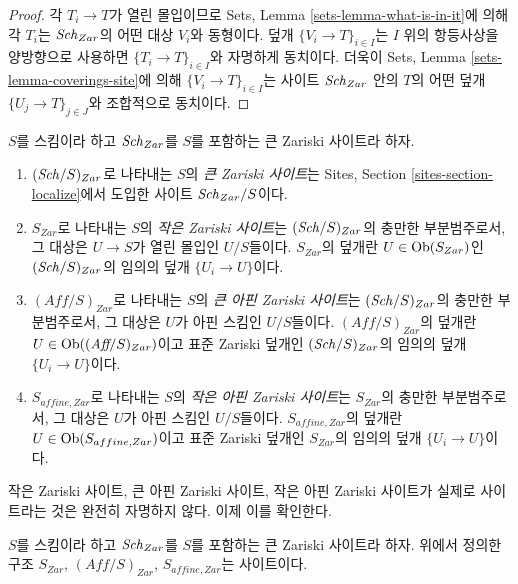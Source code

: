 \begin{proof}
각 $T_i \to T$가 열린 몰입이므로 Sets, Lemma
\ref{sets-lemma-what-is-in-it}에 의해 각 $T_i$는 $\mathit{Sch}_{Zar}$의 어떤
대상 $V_i$와 동형이다. 덮개 $\{V_i \to T\}_{i \in I}$는 $I$ 위의
항등사상을 양방향으로 사용하면 $\{T_i \to T\}_{i \in I}$와 자명하게
동치이다. 더욱이 Sets, Lemma \ref{sets-lemma-coverings-site}에 의해
$\{V_i \to T\}_{i \in I}$는 사이트 $\mathit{Sch}_{Zar}$ 안의 $T$의 어떤 덮개
$\{U_j \to T\}_{j \in J}$와 조합적으로 동치이다.
\end{proof}

\begin{definition}
\label{definition-big-small-Zariski}
$S$를 스킴이라 하고 $\mathit{Sch}_{Zar}$를 $S$를 포함하는 큰 Zariski
사이트라 하자.
\begin{enumerate}
\item $(\mathit{Sch}/S)_{Zar}$로 나타내는 $S$의 {\it 큰 Zariski 사이트}는
Sites, Section \ref{sites-section-localize}에서 도입한 사이트
$\mathit{Sch}_{Zar}/S$이다.
\item $S_{Zar}$로 나타내는 $S$의 {\it 작은 Zariski 사이트}는
$(\mathit{Sch}/S)_{Zar}$의 충만한 부분범주로서, 그 대상은 $U \to S$가 열린
몰입인 $U/S$들이다. $S_{Zar}$의 덮개란 $U \in \mathop{\mathrm{Ob}}\nolimits(S_{Zar})$인
$(\mathit{Sch}/S)_{Zar}$의 임의의 덮개 $\{U_i \to U\}$이다.
\item $(\textit{Aff}/S)_{Zar}$로 나타내는 $S$의 {\it 큰 아핀 Zariski
사이트}는 $(\mathit{Sch}/S)_{Zar}$의 충만한 부분범주로서, 그 대상은 $U$가
아핀 스킴인 $U/S$들이다. $(\textit{Aff}/S)_{Zar}$의 덮개란
$U \in \mathop{\mathrm{Ob}}\nolimits((\textit{Aff}/S)_{Zar})$이고 표준 Zariski 덮개인
$(\mathit{Sch}/S)_{Zar}$의 임의의 덮개 $\{U_i \to U\}$이다.
\item $S_{affine, Zar}$로 나타내는 $S$의 {\it 작은 아핀 Zariski
사이트}는 $S_{Zar}$의 충만한 부분범주로서, 그 대상은 $U$가 아핀
스킴인 $U/S$들이다. $S_{affine, Zar}$의 덮개란
$U \in \mathop{\mathrm{Ob}}\nolimits(S_{affine, Zar})$이고 표준 Zariski 덮개인 $S_{Zar}$의
임의의 덮개 $\{U_i \to U\}$이다.
\end{enumerate}
\end{definition}

\noindent
작은 Zariski 사이트, 큰 아핀 Zariski 사이트, 작은 아핀 Zariski
사이트가 실제로 사이트라는 것은 완전히 자명하지 않다. 이제 이를
확인한다.

\begin{lemma}
\label{lemma-verify-site-Zariski}
$S$를 스킴이라 하고 $\mathit{Sch}_{Zar}$를 $S$를 포함하는 큰 Zariski
사이트라 하자. 위에서 정의한 구조 $S_{Zar}$, $(\textit{Aff}/S)_{Zar}$,
$S_{affine, Zar}$는 사이트이다.
\end{lemma}


